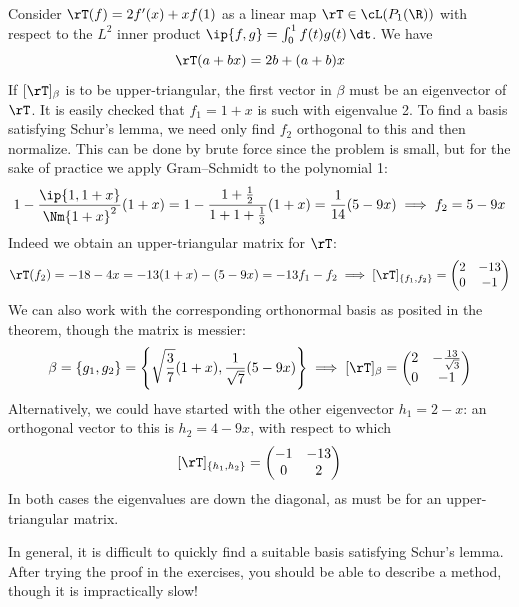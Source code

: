 \begin{example}{}{}
Consider $\rT(f)=2f'(x)+xf(1)$ as a linear map $\rT\in\cL(P_1(\R))$ with respect to the $L^2$ inner product $\ip{f,g}=\int_0^1f(t)g(t)\,\dt$. We have
\[\rT(a+bx)=2b+(a+b)x\]
If $[\rT]_\beta$ is to be upper-triangular, the first vector in $\beta$ must be an eigenvector of $\rT$.
It is easily checked that $f_1=1+x$ is such with eigenvalue 2. To find a basis satisfying Schur's lemma, we need only find $f_2$ orthogonal to this and then normalize. This can be done by brute force since the problem is small, but for the sake of practice we apply Gram--Schmidt to the polynomial 1:
\[1-\frac{\ip{1,1+x}}{\Nm{1+x}^2}(1+x)= 1-\frac{1+\frac 12}{1+1+\frac 13}(1+x)=\frac 1{14}(5-9x) \implies f_2=5-9x\]
Indeed we obtain an upper-triangular matrix for $\rT$:
\[\rT(f_2)=-18-4x =-13(1+x)-(5-9x) =-13f_1-f_2\implies [\rT]_{\{f_1,f_2\}}=\begin{pmatrix}
2&-13\\
0&-1
\end{pmatrix}\]
We can also work with the corresponding orthonormal basis as posited in the theorem, though the matrix is messier:
\[\beta=\{g_1,g_2\}=\left\{\sqrt{\frac 37}(1+x),\frac 1{\sqrt 7}(5-9x)\right\} \implies [\rT]_\beta=\begin{pmatrix}
2&-\frac{13}{\sqrt 3}\\
0&-1
\end{pmatrix}\]
Alternatively, we could have started with the other eigenvector $h_1=2-x$: an orthogonal vector to this is $h_2=4-9x$, with respect to which
\[[\rT]_{\{h_1,h_2\}}=\begin{pmatrix}
-1&-13\\
0&2
\end{pmatrix}\]
In both cases the eigenvalues are down the diagonal, as must be for an upper-triangular matrix.
\end{example}

In general, it is difficult to quickly find a suitable basis satisfying Schur's lemma. After trying the proof in the exercises, you should be able to describe a method, though it is impractically slow!

\goodbreak



